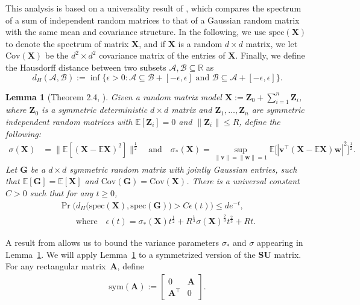 \documentclass[11pt]{article}
\let\origtop\top
\renewcommand\top{{\scriptscriptstyle{\origtop}}}
\def\w{{\mathbf w}}
\def\v{{\mathbf v}}
\def\A{{\mathbf A}}
\def\G{{\mathbf G}}
\def\S{{\mathbf S}}
\def\X{{\mathbf X}}
\def\Z{{\mathbf Z}}
\def\E{{\mathds E}}
\def\R{{\mathbf R}}
\def\U{{\mathbf U}}
\def\eps{{\epsilon}}
\def\sym{{\mathrm{sym}}}
\def\spec{{\mathrm{spec}}}
\def\R{{\mathds R}}
\def\Cov{\mathrm{Cov}}
\newtheorem{lem}[thm]{Lemma}
\begin{document}
This analysis is based on a universality result of \cite{brailovskaya2024universality}, which compares the spectrum of a sum of independent random matrices to that of a Gaussian random matrix with the same mean and covariance structure. In the following, we use $\spec(\X)$ to denote the spectrum of matrix $\X$, and if $\X$ is a random $d\times d$ matrix, we let $\Cov(\X)$ be the $d^2\times d^2$ covariance matrix of the entries of $\X$.
Finally, we define the Hausdorff distance between
two subsets $\mathcal{A}, \mathcal{B} \subseteq \R$ as
$$d_H(\mathcal{A}, \mathcal{B}) := \inf\{\eps > 0 : \mathcal{A} \subseteq \mathcal{B} + [-\eps, \eps] \text{ and } \mathcal{B} \subseteq \mathcal{A} + [-\eps, \eps]\}.
$$
\begin{lem}[Theorem 2.4,  \cite{brailovskaya2024universality}] \label{thm:brailovskayavanhandel}
Given a random matrix model $\X:= \Z_0 + \sum_{i=1}^{n} \Z_i$, where $\Z_0$ is a symmetric deterministic $d \times d$ matrix and $\Z_1, \ldots, \Z_n$ are symmetric independent random matrices with $\E[\Z_i]=0$ and $\|\Z_i\|\leq R$, define the following:
\begin{align*}
	\sigma(\X) & = \Big\|\E[(\X-\E \X)^2]\Big\|^{\frac{1}{2}}\quad\text{and}\quad
	\sigma_*(\X) = 
	\sup \limits _{\|\v\|=\|\w\|=1} \E\Big[
	|\v^\top(\X-\E \X)\w|^2\Big]^{\frac{1}{2}}.
\end{align*}
Let $\G$ be a $d\times d$ symmetric random matrix with jointly Gaussian entries, such that $\E[\G]=\E[\X]$ and $\Cov(\G)=\Cov(\X)$. There is a universal constant $C>0$ such that for any $t \geq 0$,
  \begin{align}\label{eq:haus-dist}
\Pr\Big(d_H\big(\spec(\X),\spec(\G)\big)>C\epsilon(t)\Big)\leq de^{-t},\nonumber\\
\quad\quad \text{where}\quad \epsilon(t) =
	\sigma_*(\X)  t^{\frac{1}{2}} +
	R^{\frac{1}{3}}\sigma(\X)^{\frac{2}{3}} t^{\frac{2}{3}} +
	R t.
\end{align}
\end{lem}
  A result from \cite{chenakkod2023optimal} allows us to bound the variance parameters $\sigma_*$ and $\sigma$ appearing in Lemma~\ref{thm:brailovskayavanhandel}. We will apply Lemma~\ref{thm:brailovskayavanhandel} to a symmetrized version of the $\S\U$ matrix. For any rectangular matrix~$\A$, define
  \begin{align*}\sym(\A) :=
    \begin{bmatrix}
      0 &\A\\
      \A^\top& 0
    \end{bmatrix}.
  \end{align*}
\end{document}
